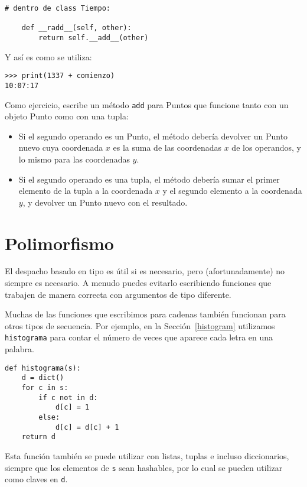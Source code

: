 \documentclass[10pt]{book}
\begin{document}
\begin{verbatim}
# dentro de class Tiempo:

    def __radd__(self, other):
        return self.__add__(other)
\end{verbatim}
%
Y así es como se utiliza:

\begin{verbatim}
>>> print(1337 + comienzo)
10:07:17
\end{verbatim}
%

Como ejercicio, escribe un método {\tt add} para Puntos que funcione tanto con
un objeto Punto como con una tupla:

\begin{itemize}

\item Si el segundo operando es un Punto, el método debería devolver un
Punto nuevo cuya coordenada $x$ es la suma de las coordenadas $x$ de los
operandos, y lo mismo para las coordenadas $y$.

\item Si el segundo operando es una tupla, el método debería sumar el
primer elemento de la tupla a la coordenada $x$ y el segundo
elemento a la coordenada $y$, y devolver un Punto nuevo con el resultado.

\end{itemize}




\section{Polimorfismo}
\label{polymorphism}

El despacho basado en tipo es útil si es necesario, pero (afortunadamente)
no siempre es necesario.  A menudo puedes evitarlo escribiendo funciones
que trabajen de manera correcta con argumentos de tipo diferente.

Muchas de las funciones que escribimos para cadenas también
funcionan para otros tipos de secuencia.
Por ejemplo, en la Sección~\ref{histogram}
utilizamos {\tt histograma} para contar el número de veces que aparece cada letra
en una palabra.

\begin{verbatim}
def histograma(s):
    d = dict()
    for c in s:
        if c not in d:
            d[c] = 1
        else:
            d[c] = d[c] + 1
    return d
\end{verbatim}
%
Esta función también se puede utilizar con listas, tuplas e incluso diccionarios,
siempre que los elementos de {\tt s} sean hashables, por lo cual se pueden utilizar
como claves en {\tt d}.
\end{document}
